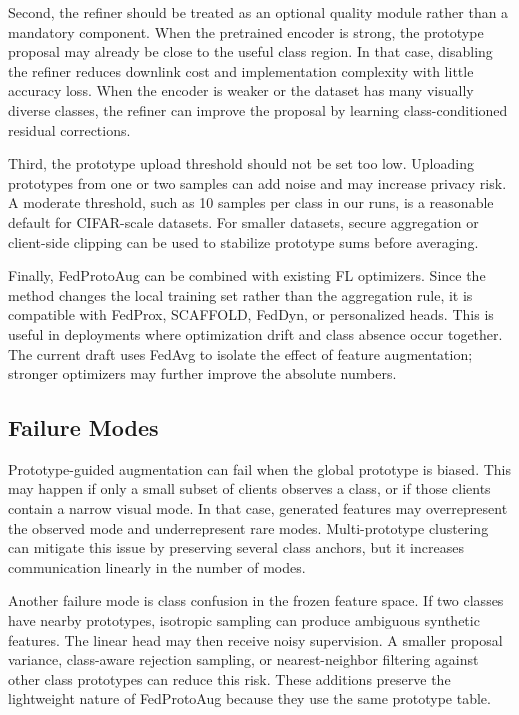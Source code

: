 ﻿\documentclass[conference]{IEEEtran}
\newcommand{\method}{FedProtoAug}
\begin{document}
Second, the refiner should be treated as an optional quality module rather than a mandatory component. When the pretrained encoder is strong, the prototype proposal may already be close to the useful class region. In that case, disabling the refiner reduces downlink cost and implementation complexity with little accuracy loss. When the encoder is weaker or the dataset has many visually diverse classes, the refiner can improve the proposal by learning class-conditioned residual corrections.

Third, the prototype upload threshold should not be set too low. Uploading prototypes from one or two samples can add noise and may increase privacy risk. A moderate threshold, such as 10 samples per class in our runs, is a reasonable default for CIFAR-scale datasets. For smaller datasets, secure aggregation or client-side clipping can be used to stabilize prototype sums before averaging.

Finally, \method{} can be combined with existing FL optimizers. Since the method changes the local training set rather than the aggregation rule, it is compatible with FedProx, SCAFFOLD, FedDyn, or personalized heads. This is useful in deployments where optimization drift and class absence occur together. The current draft uses FedAvg to isolate the effect of feature augmentation; stronger optimizers may further improve the absolute numbers.

\subsection{Failure Modes}
Prototype-guided augmentation can fail when the global prototype is biased. This may happen if only a small subset of clients observes a class, or if those clients contain a narrow visual mode. In that case, generated features may overrepresent the observed mode and underrepresent rare modes. Multi-prototype clustering can mitigate this issue by preserving several class anchors, but it increases communication linearly in the number of modes.

Another failure mode is class confusion in the frozen feature space. If two classes have nearby prototypes, isotropic sampling can produce ambiguous synthetic features. The linear head may then receive noisy supervision. A smaller proposal variance, class-aware rejection sampling, or nearest-neighbor filtering against other class prototypes can reduce this risk. These additions preserve the lightweight nature of \method{} because they use the same prototype table.
\end{document}
